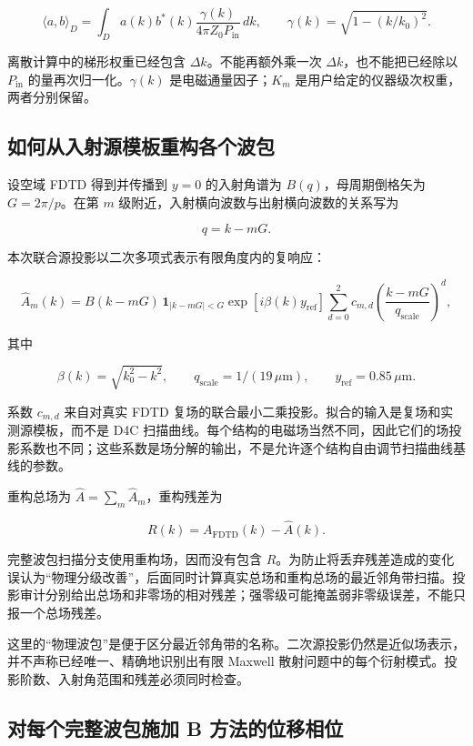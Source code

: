 \documentclass[
  chinese,
  UTF8,
  a4paper,
  11pt]{ctexart}
\begin{document}
\[
\langle a,b\rangle_D
=\int_D a(k)b^*(k)
\frac{\gamma(k)}{4\pi Z_0P_{\mathrm{in}}}\,dk,
\qquad
\gamma(k)=\sqrt{1-(k/k_0)^2}.
\]

离散计算中的梯形权重已经包含 \(\Delta k\)。不能再额外乘一次
\(\Delta k\)，也不能把已经除以 \(P_{\mathrm{in}}\)
的量再次归一化。\(\gamma(k)\) 是电磁通量因子；\(K_m\)
是用户给定的仪器级次权重，两者分别保留。

\subsection{如何从入射源模板重构各个波包}\label{ux5982ux4f55ux4eceux5165ux5c04ux6e90ux6a21ux677fux91cdux6784ux5404ux4e2aux6ce2ux5305}

设空域 FDTD 得到并传播到 \(y=0\) 的入射角谱为 \(B(q)\)，母周期倒格矢为
\(G=2\pi/p\)。在第 \(m\) 级附近，入射横向波数与出射横向波数的关系写为

\[
q=k-mG.
\]

本次联合源投影以二次多项式表示有限角度内的复响应：

\[
\widehat A_m(k)
=B(k-mG)\,\mathbf 1_{|k-mG|<G}
\exp[i\beta(k)y_{\mathrm{ref}}]
\sum_{d=0}^{2}c_{m,d}
\left(\frac{k-mG}{q_{\mathrm{scale}}}\right)^d,
\]

其中

\[
\beta(k)=\sqrt{k_0^2-k^2},\qquad
q_{\mathrm{scale}}=1/(19\,\mu{\mathrm{m}}),\qquad
y_{\mathrm{ref}}=0.85\,\mu{\mathrm{m}}.
\]

系数 \(c_{m,d}\) 来自对真实 FDTD
复场的联合最小二乘投影。拟合的输入是复场和实测源模板，而不是 D4C
扫描曲线。每个结构的电磁场当然不同，因此它们的场投影系数也不同；这些系数是场分解的输出，不是允许逐个结构自由调节扫描曲线基线的参数。

重构总场为 \(\widehat A=\sum_m\widehat A_m\)，重构残差为

\[
R(k)=A_{\mathrm{FDTD}}(k)-\widehat A(k).
\]

完整波包扫描分支使用重构场，因而没有包含
\(R\)。为防止将丢弃残差造成的变化误认为``物理分级改善''，后面同时计算真实总场和重构总场的最近邻角带扫描。投影审计分别给出总场和非零场的相对残差；强零级可能掩盖弱非零级误差，不能只报一个总场残差。

这里的``物理波包''是便于区分最近邻角带的名称。二次源投影仍然是近似场表示，并不声称已经唯一、精确地识别出有限
Maxwell
散射问题中的每个衍射模式。投影阶数、入射角范围和残差必须同时检查。

\subsection{对每个完整波包施加 B
方法的位移相位}\label{ux5bf9ux6bcfux4e2aux5b8cux6574ux6ce2ux5305ux65bdux52a0-b-ux65b9ux6cd5ux7684ux4f4dux79fbux76f8ux4f4d}
\end{document}
